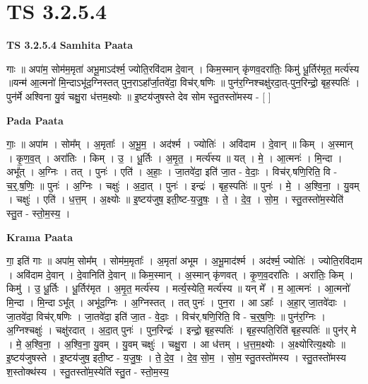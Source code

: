 \documentclass[17pt]{extarticle}
\begin{document}
\section{ TS 3.2.5.4 }

\textbf{TS 3.2.5.4 } \newline
\textbf{Samhita Paata} \newline

गाः ॥ अपा॑म॒ सोम॑म॒मृता॑ अभू॒माऽद॑र्श्म॒ ज्योति॒रवि॑दाम दे॒वान् । किम॒स्मान् कृ॑णव॒दरा॑तिः॒ किमु॑ धू॒र्तिर॑मृत॒ मर्त्य॑स्य ॥यन्म॑ आ॒त्मनो॑ मि॒न्दाऽभू॑द॒ग्निस्तत् पुन॒राऽहा᳚र्जा॒तवे॑दा॒ विच॑र्.षणिः ॥ पुन॑र॒ग्निश्चक्षु॑रदा॒त्-पुन॒रिन्द्रो॒ बृह॒स्पतिः॑ । पुन॑र्मे अश्विना यु॒वं चक्षु॒रा ध॑त्तम॒क्ष्योः ॥ इ॒ष्टय॑जुषस्ते देव सोम स्तु॒तस्तो॑मस्य - [  ] \newline

\textbf{Pada Paata} \newline

गाः॒ ॥ अपा॑म । सोम᳚म् । अ॒मृताः᳚ । अ॒भू॒म॒ । अद॑र्श्म । ज्योतिः॑ । अवि॑दाम । दे॒वान् ॥ किम् । अ॒स्मान् । कृ॒ण॒व॒त् । अरा॑तिः । किम् । उ॒ । धू॒र्तिः । अ॒मृ॒त॒ । मर्त्य॑स्य ॥ यत् । मे॒ । आ॒त्मनः॑ । मि॒न्दा । अभू᳚त् । अ॒ग्निः । तत् । पुनः॑ । एति॑ । अ॒हाः॒ । जा॒तवे॑दा॒ इति॑ जा॒त - वे॒दाः॒ । विच॑र्.षणि॒रिति॒ वि - च॒र्॒.ष॒णिः॒ ॥ पुनः॑ । अ॒ग्निः । चक्षुः॑ । अ॒दा॒त् । पुनः॑ । इन्द्रः॑ । बृह॒स्पतिः॑ ॥ पुनः॑ । मे॒ । अ॒श्वि॒ना॒ । यु॒वम् । चक्षुः॑ । एति॑ । ध॒त्त॒म् । अ॒क्ष्योः ॥ इ॒ष्टय॑जुष॒ इती॒ष्ट-य॒जु॒षः॒ । ते॒ । दे॒व॒ । सो॒म॒ । स्तु॒तस्तो॑म॒स्येति॑ स्तु॒त - स्तो॒म॒स्य॒ ।  \newline


\textbf{Krama Paata} \newline

गा॒ इति॑ गाः ॥ अपा॑म॒ सोम᳚म् । सोम॑म॒मृताः᳚ । अ॒मृता॑ अभूम । अ॒भू॒माद॑र्श्म । अद॑र्श्म॒ ज्योतिः॑ । ज्योति॒रवि॑दाम । अवि॑दाम दे॒वान् । दे॒वानिति॑ दे॒वान् ॥ किम॒स्मान् । अ॒स्मान् कृ॑णवत् । कृ॒ण॒व॒दरा॑तिः । अरा॑तिः॒ किम् । किमु॑ । उ॒ धू॒र्तिः । धू॒र्तिर॑मृत । अ॒मृ॒त॒ मर्त्य॑स्य । मर्त्य॒स्येति॒ मर्त्य॑स्य ॥ यन् मे᳚ । म॒ आ॒त्मनः॑ । आ॒त्मनो॑ मि॒न्दा । मि॒न्दा ऽभू᳚त् । अभू॑द॒ग्निः । अ॒ग्निस्तत् । तत् पुनः॑ । पुन॒रा । आ ऽहाः᳚ । अ॒हा॒र् जा॒तवे॑दाः । जा॒तवे॑दा॒ विच॑र्.षणिः । जा॒तवे॑दा॒ इति॑ जा॒त - वे॒दाः॒ । विच॑र्.षणि॒रिति॒ वि - च॒र्॒ष॒णिः॒ ॥ पुन॑र॒ग्निः । अ॒ग्निश्चक्षुः॑ । चक्षु॑रदात् । अ॒दा॒त् पुनः॑ । पुन॒रिन्द्रः॑ । इन्द्रो॒ बृह॒स्पतिः॑ । बृह॒स्पति॒रिति॑ बृह॒स्पतिः॑ ॥ पुन॑र् मे । मे॒ अ॒श्वि॒ना॒ । अ॒श्वि॒ना॒ यु॒वम् । यु॒वम् चक्षुः॑ । चक्षु॒रा । आ ध॑त्तम् । ध॒त्त॒म॒क्ष्योः । अ॒क्ष्योरित्य॒क्ष्योः ॥ इ॒ष्टय॑जुषस्ते । इ॒ष्टय॑जुष॒ इती॒ष्ट - य॒जु॒षः॒ । ते॒ दे॒व॒ । दे॒व॒ सो॒म॒ । सो॒म॒ स्तु॒तस्तो॑मस्य । स्तु॒तस्तो॑मस्य श॒स्तोक्थ॑स्य । स्तु॒तस्तो॑म॒स्येति॑ स्तु॒त - स्तो॒म॒स्य॒ \newline
\end{document}
